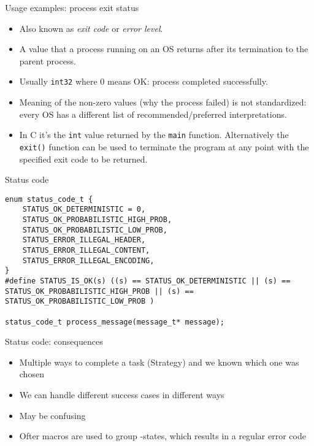 \documentclass[aspectratio=169,14pt]{beamer}
\begin{document}
\begin{frame}{Usage examples: process exit status}
\begin{itemize}
    \item Also known as \textit{exit code} or \textit{error level}.
    \item A value that a process running on an OS returns after its termination to the parent process.
    \item Usually \texttt{int32} where 0 means OK: process completed successfully.
    \item Meaning of the non-zero values (why the process failed) is not standardized: every OS has a different list of recommended/preferred interpretations.
    \item In C it's the \texttt{int} value returned by the \texttt{main} function. Alternatively the \texttt{exit()} function can be used to terminate the program at any point with the specified exit code to be returned.
\end{itemize}
\end{frame}


\begin{frame}[fragile]{Status code}
\begin{lstlisting}[style=cstyle]
enum status_code_t {
    STATUS_OK_DETERMINISTIC = 0,
    STATUS_OK_PROBABILISTIC_HIGH_PROB,
    STATUS_OK_PROBABILISTIC_LOW_PROB,
    STATUS_ERROR_ILLEGAL_HEADER,
    STATUS_ERROR_ILLEGAL_CONTENT,
    STATUS_ERROR_ILLEGAL_ENCODING,
}
#define STATUS_IS_OK(s) ((s) == STATUS_OK_DETERMINISTIC || (s) == STATUS_OK_PROBABILISTIC_HIGH_PROB || (s) == STATUS_OK_PROBABILISTIC_LOW_PROB )

status_code_t process_message(message_t* message);
\end{lstlisting}
\end{frame}


\begin{frame}[fragile]{Status code: consequences}
\begin{itemize}
    \item Multiple ways to complete a task (Strategy) and we known which one was chosen
    \item We can handle different success cases in different ways
    \item May be confusing
    \item Ofter macros are used to group -states, which results in a regular error code
\end{itemize}
\end{frame}
\end{document}
